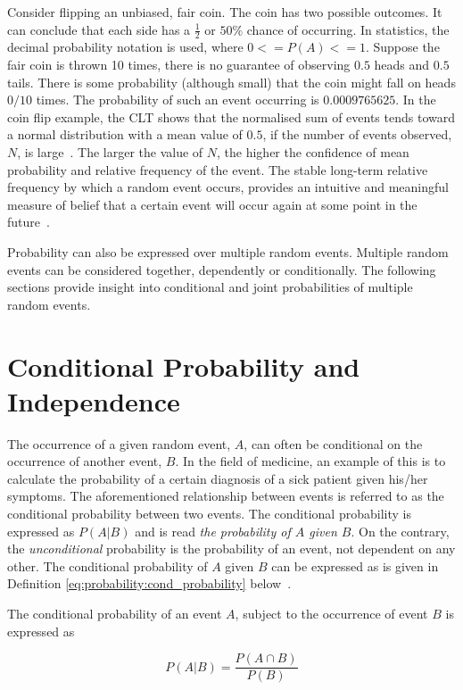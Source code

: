 Consider flipping an unbiased, fair coin. The coin has two possible outcomes. It can conclude that each side has a $\frac{1}{2}$ or $50\%$ chance of occurring. In statistics, the decimal probability notation is used, where $0 <= P(A) <= 1$. Suppose the fair coin is thrown 10 times, there is no guarantee of observing $0.5$ heads and $0.5$ tails. There is some probability (although small) that the coin might fall on heads $0/10$ times. The probability of such an event occurring is $0.0009765625$. In the coin flip example, the \acf{CLT} shows that the normalised sum of events tends toward a normal distribution with a mean value of $0.5$, if the number of events observed, $N$, is large~\cite{ref:wackerly:2014}. The larger the value of $N$, the higher the confidence of mean probability and relative frequency of the event. The stable long-term relative frequency by which a random event occurs, provides an intuitive and meaningful measure of belief that a certain event will occur again at some point in the future~\cite{ref:wackerly:2014}.

Probability can also be expressed over multiple random events. Multiple random events can be considered together, dependently or conditionally. The following sections provide insight into conditional and joint probabilities of multiple random events.

\section{Conditional Probability and Independence}\label{sec:probability:cond_probability}

The occurrence of a given random event, $A$, can often be conditional on the occurrence of another event, $B$. In the field of medicine, an example of this is to calculate the probability of a certain diagnosis of a sick patient given his/her symptoms. The aforementioned relationship between events is referred to as the conditional probability between two events. The conditional probability is expressed as $P(A \vert B)$ and is read \textit{the probability of $A$ given $B$}. On the contrary, the \textit{unconditional} probability is the probability of an event, not dependent on any other. The conditional probability of $A$ given $B$ can be expressed as is given in Definition \ref{eq:probability:cond_probability} below~\cite{ref:wackerly:2014}.
\\
\begin{definition}
      \label{eq:probability:cond_probability}
      The conditional probability of an event $A$, subject to the occurrence of event $B$ is expressed as

      \begin{equation}
            \label{eq:probability:overview:conditional}
            P(A \vert B) = \frac{P(A \cap B)}{P(B)}
      \end{equation}
\end{definition}

